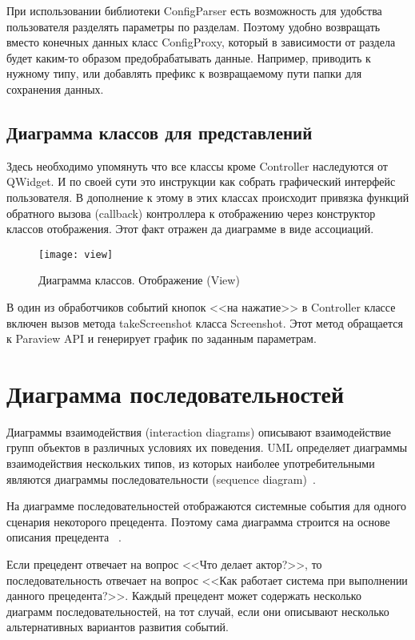 \documentclass[14pt]{extreport}
\begin{document}
При использовании библиотеки ConfigParser есть возможность для удобства пользователя разделять параметры по разделам. Поэтому удобно возвращать вместо конечных данных класс ConfigProxy, который в зависимости от раздела будет каким-то образом предобрабатывать данные. Например, приводить к нужному типу, или добавлять префикс к возвращаемому пути папки для сохранения данных. 

\subsection{Диаграмма классов для представлений}

Здесь необходимо упомянуть что все классы кроме Controller наследуются от QWidget. И по своей сути это инструкции как собрать графический интерфейс пользователя. В дополнение к этому в этих классах происходит привязка функций обратного вызова (callback) контроллера к отображению через конструктор классов отображения. Этот факт отражен да диаграмме в виде ассоциаций. 


\begin{figure}[H]
	\centerline{\texttt{[image: view]}}
	\caption{Диаграмма классов. Отображение (View)}
	\label{fig8}
\end{figure}

В один из обработчиков событий кнопок <<на нажатие>> в Controller классе включен вызов метода takeScreenshot класса Screenshot. Этот метод обращается к Paraview API и генерирует график по заданным параметрам.


\section{Диаграмма последовательностей}
Диаграммы взаимодействия (interaction diagrams) описывают взаимодействие групп объектов в различных условиях их поведения. UML определяет диаграммы взаимодействия нескольких типов, из которых наиболее употребительными являются диаграммы последовательности (sequence diagram)~\cite{umlDistilled}.

На диаграмме последовательностей отображаются системные события для одного
сценария некоторого прецедента. Поэтому сама диаграмма строится на основе описания
прецедента ~\cite{umlApplying}. 

Если прецедент отвечает на вопрос <<Что делает актор?>>, то последовательность отвечает на вопрос <<Как работает система при выполнении данного прецедента?>>.
Каждый прецедент может содержать несколько диаграмм последовательностей, на тот случай, если они описывают несколько альтернативных вариантов развития событий.
\end{document}
